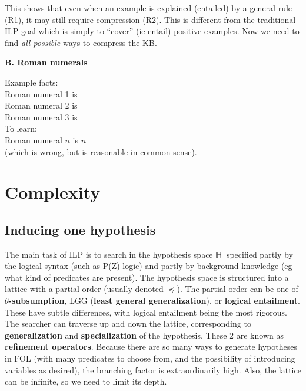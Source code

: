 This shows that even when an example is explained (entailed) by a general rule (R1), it may still require compression (R2).  This is different from the traditional ILP goal which is simply to ``cover'' (ie entail) positive examples.  Now we need to find \textit{all possible} ways to compress the KB.

\textbf{B. Roman numerals}

Example facts:\\
\hspace*{1cm} Roman numeral 1 is \\
\hspace*{1cm} Roman numeral 2 is \\
\hspace*{1cm} Roman numeral 3 is \\
To learn:\\
\hspace*{1cm} Roman numeral $n$ is $n$ \\
(which is wrong, but is reasonable in common sense).

\section{Complexity}

\subsection{Inducing one hypothesis}

The main task of ILP is to search in the hypothesis space $\mathbb{H} \;$ specified partly by the logical syntax (such as P(Z) logic) and partly by background knowledge (eg what kind of predicates are present).  The hypothesis space is structured into a lattice with a partial order (usually denoted $ \preceq $).  The partial order can be one of \textbf{$\theta$-subsumption}, LGG (\textbf{least general generalization}), or \textbf{logical entailment}.  These have subtle differences, with logical entailment being the most rigorous.  The searcher can traverse up and down the lattice, corresponding to \textbf{generalization} and \textbf{specialization} of the hypothesis.  These 2 are known as \textbf{refinement operators}.  Because there are so many ways to generate hypotheses in FOL (with many predicates to choose from, and the possibility of introducing variables as desired), the branching factor is extraordinarily high.  Also, the lattice can be infinite, so we need to limit its depth.

